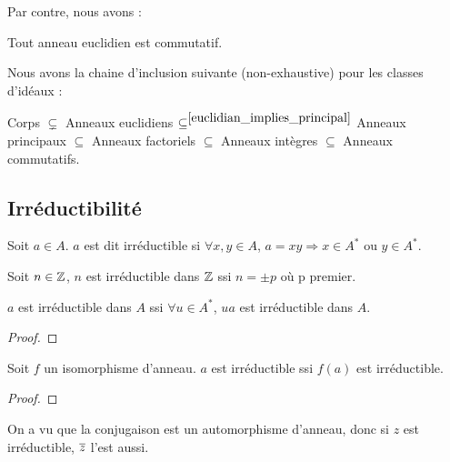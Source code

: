Par contre, nous avons :
\begin{proposition}
	Tout anneau euclidien est commutatif.
\end{proposition}

Nous avons la chaine d'inclusion suivante (non-exhaustive) pour les classes
d'idéaux :
\begin{theorem}
	Corps
	$\displaystyle \subsetneq$ Anneaux euclidiens
	$\displaystyle \subseteq^{\ref{euclidian_implies_principal}}$ Anneaux principaux
	$\subseteq$ Anneaux factoriels $\subseteq$ Anneaux intègres $\subseteq$
	Anneaux commutatifs.
	\label{ideal_class}
\end{theorem}

\subsection{Irréductibilité}

\begin{definition} 
	Soit $a \in A$. $a$ est dit irréductible si $\forall x, y \in A$, $a = xy
	\Rightarrow x \in A^{*}$ ou $y \in A^{*}$.
	\label{irreductible_element}
\end{definition}

\begin{exemple}
	Soit $n \in \mathbb{Z}$, $n$ est irréductible dans $\mathbb{Z}$ ssi $n = \pm p$
	où p premier.
\end{exemple}

\begin{proposition}
	$a$ est irréductible dans $A$ ssi $\forall u \in A^{*}$, $ua$ est
	irréductible dans $A$.
\end{proposition}

\ifdefined\outputproof
\begin{proof}

\end{proof}
\fi

\begin{proposition}
	Soit $f$ un isomorphisme d'anneau. $a$ est irréductible ssi $f(a)$ est
	irréductible.
\end{proposition}

\ifdefined\outputproof
\begin{proof}

\end{proof}
\fi

\begin{exemple}
	On a vu que la conjugaison est un automorphisme d'anneau, donc si $z$ est
	irréductible, $\overline{z}$ l'est aussi.
\end{exemple}

